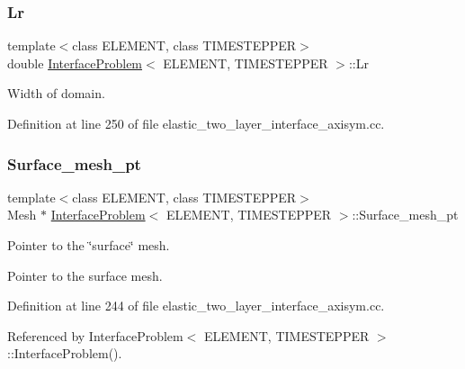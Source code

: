 \subsubsection{\texorpdfstring{Lr}{Lr}}
{\footnotesize\ttfamily template$<$class E\+L\+E\+M\+E\+NT, class T\+I\+M\+E\+S\+T\+E\+P\+P\+ER$>$ \\
double \hyperlink{classInterfaceProblem}{Interface\+Problem}$<$ E\+L\+E\+M\+E\+NT, T\+I\+M\+E\+S\+T\+E\+P\+P\+ER $>$\+::Lr\hspace{0.3cm}{\ttfamily [private]}}



Width of domain. 



Definition at line 250 of file elastic\+\_\+two\+\_\+layer\+\_\+interface\+\_\+axisym.\+cc.

\mbox{\label{classInterfaceProblem_a011c7b4f2307ff909f64dc158e8fc674}} 
\subsubsection{\texorpdfstring{Surface\+\_\+mesh\+\_\+pt}{Surface\_mesh\_pt}}
{\footnotesize\ttfamily template$<$class E\+L\+E\+M\+E\+NT, class T\+I\+M\+E\+S\+T\+E\+P\+P\+ER$>$ \\
Mesh $\ast$ \hyperlink{classInterfaceProblem}{Interface\+Problem}$<$ E\+L\+E\+M\+E\+NT, T\+I\+M\+E\+S\+T\+E\+P\+P\+ER $>$\+::Surface\+\_\+mesh\+\_\+pt\hspace{0.3cm}{\ttfamily [private]}}



Pointer to the \char`\"{}surface\char`\"{} mesh. 

Pointer to the surface mesh. 

Definition at line 244 of file elastic\+\_\+two\+\_\+layer\+\_\+interface\+\_\+axisym.\+cc.



Referenced by Interface\+Problem$<$ E\+L\+E\+M\+E\+N\+T, T\+I\+M\+E\+S\+T\+E\+P\+P\+E\+R $>$\+::\+Interface\+Problem().

\mbox{\label{classInterfaceProblem_a45e3bf3b44bcbeefab21a3598bef6179}} 
